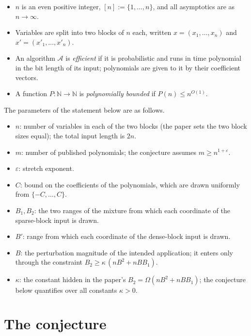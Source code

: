\documentclass{aicr-conjecture}
\newcommand{\NN}{\mathbb{N}}
\newcommand{\cA}{\mathcal{A}}
\begin{document}
\begin{itemize}[leftmargin=1.2em]
  \item $n$ is an even positive integer, $[n] := \{1, \dots, n\}$, and
  all asymptotics are as $n \to \infty$.
  \item Variables are split into two blocks of $n$ each, written
  $x = (x_1, \dots, x_n)$ and $x' = (x'_1, \dots, x'_n)$.
  \item An algorithm $\cA$ is \emph{efficient} if it is probabilistic
  and runs in time polynomial in the bit length of its input;
  polynomials are given to it by their coefficient vectors.
  \item A function $P : \NN \to \NN$ is \emph{polynomially bounded} if
  $P(n) \le n^{O(1)}$.
\end{itemize}

The parameters of the statement below are as follows.

\begin{itemize}[leftmargin=1.2em]
  \item $n$: number of variables in each of the two blocks (the paper
  sets the two block sizes equal); the total input length is $2n$.
  \item $m$: number of published polynomials; the conjecture assumes
  $m \ge n^{1+\varepsilon}$.
  \item $\varepsilon$: stretch exponent.
  \item $C$: bound on the coefficients of the polynomials, which are
  drawn uniformly from $\{-C, \dots, C\}$.
  \item $B_1, B_2$: the two ranges of the mixture from which each
  coordinate of the sparse-block input is drawn.
  \item $B'$: range from which each coordinate of the dense-block input
  is drawn.
  \item $B$: the perturbation magnitude of the intended application; it
  enters only through the constraint
  $B_2 \ge \kappa\,(n B^2 + n B B_1)$.
  \item $\kappa$: the constant hidden in the paper's
  $B_2 = \Omega(n B^2 + n B B_1)$; the conjecture below quantifies over
  all constants $\kappa > 0$.
\end{itemize}

\section{The conjecture}\label{sec:conjectures}
\end{document}

